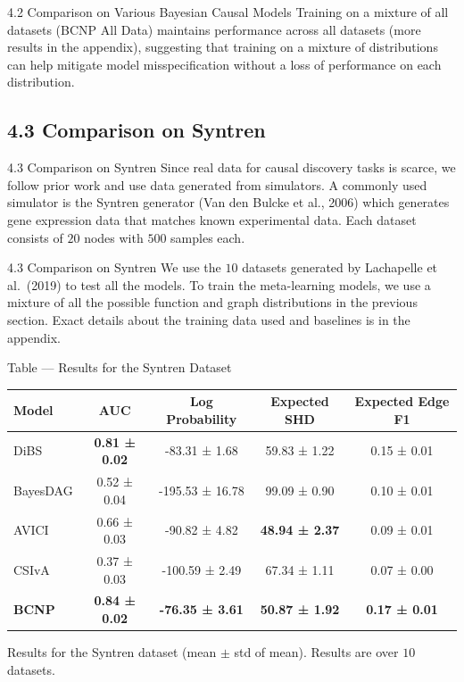 \documentclass[aspectratio=169,10pt]{beamer}
\begin{document}
\begin{frame}{4.2 Comparison on Various Bayesian Causal Models}
Training on a mixture of all datasets (BCNP All Data) maintains performance across all datasets (more results in the appendix), suggesting that training on a mixture of distributions can help mitigate model misspecification without a loss of performance on each distribution.
\end{frame}

\subsection{4.3 Comparison on Syntren}

\begin{frame}{4.3 Comparison on Syntren}
\small
Since real data for causal discovery tasks is scarce, we follow prior work and use data generated from simulators. A commonly used simulator is the Syntren generator (Van den Bulcke et al., 2006) which generates gene expression data that matches known experimental data. Each dataset consists of $20$ nodes with $500$ samples each.
\end{frame}

\begin{frame}{4.3 Comparison on Syntren}
We use the $10$ datasets generated by Lachapelle et al.\ (2019) to test all the models. To train the meta-learning models, we use a mixture of all the possible function and graph distributions in the previous section. Exact details about the training data used and baselines is in the appendix.
\end{frame}

\begin{frame}{Table --- Results for the Syntren Dataset}
\centering
\begin{tabular}{lcccc}
\toprule
\textbf{Model} & \textbf{AUC} & \textbf{ Log Probability} & \textbf{Expected SHD} & \textbf{Expected Edge F1} \\
\midrule
DiBS & \textbf{0.81 ± 0.02} & -83.31 ± 1.68 & 59.83 ± 1.22 & 0.15 ± 0.01 \\
BayesDAG & 0.52 ± 0.04 & -195.53 ± 16.78 & 99.09 ± 0.90 & 0.10 ± 0.01 \\
AVICI & 0.66 ± 0.03 & -90.82 ± 4.82 & \textbf{48.94 ± 2.37} & 0.09 ± 0.01 \\
CSIvA & 0.37 ± 0.03 & -100.59 ± 2.49 & 67.34 ± 1.11 & 0.07 ± 0.00 \\
\textbf{BCNP} & \textbf{0.84 ± 0.02} & \textbf{-76.35 ± 3.61} & \textbf{50.87 ± 1.92} & \textbf{0.17 ± 0.01} \\
\bottomrule
\end{tabular}

\vspace{0.3cm}
{\footnotesize Results for the Syntren dataset (mean $\pm$ std of mean). Results are over $10$ datasets.}
\end{frame}
\end{document}
